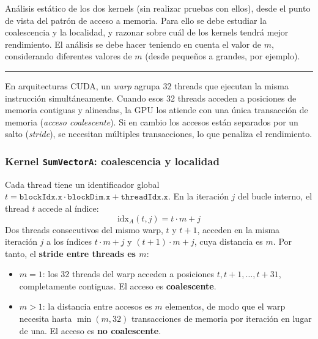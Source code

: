 \documentclass[12pt]{article}
\newenvironment{exercise}[2][Ejercicio]{\begin{trivlist}
\item[\hskip \labelsep {\bfseries #1}\hskip \labelsep {\bfseries #2.}]}{\end{trivlist}}
\begin{document}
\begin{exercise}{2}
    Análisis estático de los dos kernels (sin realizar pruebas con ellos), desde el punto de vista
    del patrón de acceso a memoria. Para ello se debe estudiar la coalescencia y la localidad, y
    razonar sobre cuál de los kernels tendrá mejor rendimiento. El análisis se debe hacer teniendo
    en cuenta el valor de $m$, considerando diferentes valores de $m$ (desde pequeños a grandes, por
    ejemplo).

    \begin{center}
        \noindent\rule{4cm}{0.2pt}
    \end{center}

    En arquitecturas CUDA, un \textit{warp} agrupa 32 threads que ejecutan la misma instrucción
    simultáneamente. Cuando esos 32 threads acceden a posiciones de memoria contiguas y alineadas,
    la GPU los atiende con una única transacción de memoria (\textit{acceso coalescente}). Si en
    cambio los accesos están separados por un salto (\textit{stride}), se necesitan múltiples
    transacciones, lo que penaliza el rendimiento.

    \subsubsection*{Kernel \texttt{SumVectorA}: coalescencia y localidad}

    Cada thread tiene un identificador global $t = \texttt{blockIdx.x} \cdot \texttt{blockDim.x}
        + \texttt{threadIdx.x}$. En la iteración $j$ del bucle interno, el thread $t$ accede al índice:
    \begin{equation}
        \text{idx}_A(t,j) = t \cdot m + j
    \end{equation}
    Dos threads consecutivos del mismo warp, $t$ y $t+1$, acceden en la misma iteración $j$ a los
    índices $t \cdot m + j$ y $(t+1) \cdot m + j$, cuya distancia es $m$. Por tanto, el
    \textbf{stride entre threads es $m$}:

    \begin{itemize}
        \item \textbf{$m = 1$}: los 32 threads del warp acceden a posiciones $t, t+1, \ldots, t+31$,
              completamente contiguas. El acceso es \textbf{coalescente}.
        \item \textbf{$m > 1$}: la distancia entre accesos es $m$ elementos, de modo que el warp
              necesita hasta $\min(m, 32)$ transacciones de memoria por iteración en lugar de una.
              El acceso es \textbf{no coalescente}.
    \end{itemize}


\end{exercise}
\end{document}
